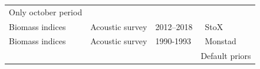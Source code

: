 \documentclass[
]{article}
\begin{document}
\begin{longtable}[]{@{}llll@{}}
\begin{minipage}[t]{0.33\columnwidth}
Only october period\strut
\end{minipage}\tabularnewline
\begin{minipage}[t]{0.21\columnwidth}\raggedright
Biomass indices\strut
\end{minipage} & \begin{minipage}[t]{0.20\columnwidth}\raggedright
Acoustic survey\strut
\end{minipage} & \begin{minipage}[t]{0.15\columnwidth}\raggedright
2012--2018\strut
\end{minipage} & \begin{minipage}[t]{0.33\columnwidth}\raggedright
~StoX\strut
\end{minipage}\tabularnewline
\begin{minipage}[t]{0.21\columnwidth}\raggedright
Biomass indices\strut
\end{minipage} & \begin{minipage}[t]{0.20\columnwidth}\raggedright
Acoustic survey\strut
\end{minipage} & \begin{minipage}[t]{0.15\columnwidth}\raggedright
1990-1993\strut
\end{minipage} & \begin{minipage}[t]{0.33\columnwidth}\raggedright
~Monstad\strut
\end{minipage}\tabularnewline
\begin{minipage}[t]{0.21\columnwidth}\raggedright
\strut
\end{minipage} & \begin{minipage}[t]{0.20\columnwidth}\raggedright
\strut
\end{minipage} & \begin{minipage}[t]{0.15\columnwidth}\raggedright
\strut
\end{minipage} & \begin{minipage}[t]{0.33\columnwidth}\raggedright
Default priors\strut
\end{minipage}\tabularnewline
\bottomrule
\end{longtable}
\end{document}
